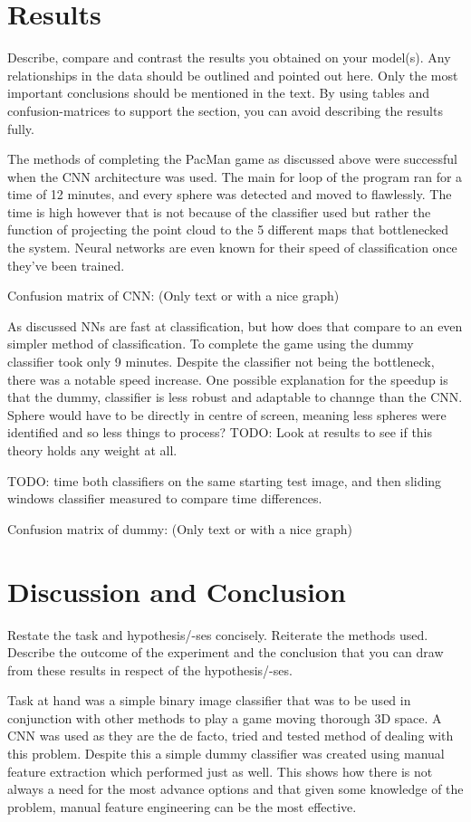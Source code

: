 \documentclass{article}
\begin{document}
\section{Results}
Describe, compare and contrast the results you obtained on your
model(s). Any relationships in the data should be outlined and pointed
out here. Only the most important conclusions should be mentioned in
the text. By using tables and confusion-matrices to support the section,
you can avoid describing the results fully.

The methods of completing the PacMan game as discussed above were successful when the CNN architecture was used.
The main for loop of the program ran for a time of 12 minutes, and every sphere was detected and moved to flawlessly.
The time is high however that is not because of the classifier used but rather the function of projecting the point cloud to the 5 different maps that bottlenecked the system.
Neural networks are even known for their speed of classification once they've been trained.

Confusion matrix of CNN:
(Only text or with a nice graph)


As discussed NNs are fast at classification, but how does that compare to an even simpler method of classification.
To complete the game using the dummy classifier took only 9 minutes.
Despite the classifier not being the bottleneck, there was a notable speed increase.
One possible explanation for the speedup is that the dummy, classifier is less robust and adaptable to channge than the CNN.
Sphere would have to be directly in centre of screen, meaning less spheres were identified and so less things to process?
TODO: Look at results to see if this theory holds any weight at all.

TODO: time both classifiers on the same starting test image, and then sliding windows classifier measured to compare time differences.


Confusion matrix of dummy:
(Only text or with a nice graph)


\section{Discussion and Conclusion}
Restate the task and hypothesis/-ses concisely.
Reiterate the methods used. Describe the outcome of the experiment
and the conclusion that you can draw from these results in respect of the
hypothesis/-ses.

Task at hand was a simple binary image classifier that was to be used in conjunction with other methods to play a game moving thorough 3D space.
A CNN was used as they are the de facto, tried and tested method of dealing with this problem.
Despite this a simple dummy classifier was created using manual feature extraction which performed just as well.
This shows how there is not always a need for the most advance options and that given some knowledge of the problem, manual feature engineering can be the most effective.

\printbibliography
\end{document}

